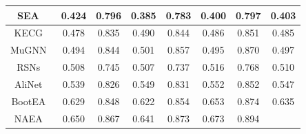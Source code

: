{\begin{tabular}{@{}cccccccc@{}}
          \multicolumn{1}{c|}{SEA~\cite{pei2019semi}} &
            \multicolumn{1}{c}{0.424} &
            \multicolumn{1}{c|}{0.796} &
            \multicolumn{1}{c}{0.385} &
            \multicolumn{1}{c|}{0.783} &
            \multicolumn{1}{c}{0.400} &
            \multicolumn{1}{c|}{0.797} &
            0.403\\
            \midrule
          \multicolumn{1}{c|}{KECG~\cite{li2019semi}} &
            \multicolumn{1}{c}{0.478} &
            \multicolumn{1}{c|}{0.835} &
            \multicolumn{1}{c}{0.490} &
            \multicolumn{1}{c|}{0.844} &
            \multicolumn{1}{c}{0.486} &
            \multicolumn{1}{c|}{0.851} &
            0.485\\ 
            \midrule
          \multicolumn{1}{c|}{MuGNN~\cite{cao2019multi}} &
            \multicolumn{1}{c}{0.494} &
            \multicolumn{1}{c|}{0.844} &
            \multicolumn{1}{c}{0.501} &
            \multicolumn{1}{c|}{0.857} &
            \multicolumn{1}{c}{0.495} &
            \multicolumn{1}{c|}{0.870} &
            0.497\\ 
            \midrule
          \multicolumn{1}{c|}{RSNs~\cite{guo2019learning}} &
            \multicolumn{1}{c}{0.508} &
            \multicolumn{1}{c|}{0.745} &
            \multicolumn{1}{c}{0.507} &
            \multicolumn{1}{c|}{0.737} &
            \multicolumn{1}{c}{0.516} &
            \multicolumn{1}{c|}{0.768} &
            0.510\\ 
            \midrule
          \multicolumn{1}{c|}{AliNet~\cite{DBLP:journals/corr/abs-1911-08936}} &
            \multicolumn{1}{c}{0.539} &
            \multicolumn{1}{c|}{0.826} &
            \multicolumn{1}{c}{0.549} &
            \multicolumn{1}{c|}{0.831} &
            \multicolumn{1}{c}{0.552} &
            \multicolumn{1}{c|}{0.852} &
            0.547\\ 
            \midrule
          \multicolumn{1}{c|}{BootEA~\cite{sun2018bootstrapping}} &
            \multicolumn{1}{c}{0.629} &
            \multicolumn{1}{c|}{0.848} &
            \multicolumn{1}{c}{0.622} &
            \multicolumn{1}{c|}{0.854} &
            \multicolumn{1}{c}{0.653} &
            \multicolumn{1}{c|}{0.874} &
            0.635\\ 
            \midrule
          \multicolumn{1}{c|}{NAEA~\cite{zhu2019neighborhood}} &
            \multicolumn{1}{c}{0.650} &
            \multicolumn{1}{c|}{0.867} &
            \multicolumn{1}{c}{0.641} &
            \multicolumn{1}{c|}{0.873} &
            \multicolumn{1}{c}{0.673} &
            \multicolumn{1}{c|}{0.894} &

\end{tabular}}
